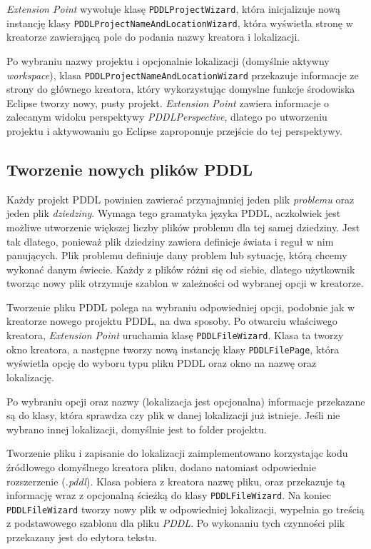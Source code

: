 \emph{Extension Point} wywołuje klasę \texttt{PDDLProjectWizard}, która inicjalizuje nową instancję klasy \texttt{PDDLProjectNameAndLocationWizard}, która wyświetla stronę w kreatorze zawierającą pole do podania nazwy kreatora i lokalizacji. 

Po wybraniu nazwy projektu i opcjonalnie lokalizacji (domyślnie aktywny \emph{workspace}), klasa \texttt{PDDLProjectNameAndLocationWizard} przekazuje informacje ze strony do głównego kreatora, który wykorzystując domyslne funkcje środowiska Eclipse tworzy nowy, pusty projekt. \emph{Extension Point} zawiera informacje o zalecanym widoku perspektywy \emph{PDDLPerspective}, dlatego po utworzeniu projektu i aktywowaniu go Eclipse zaproponuje przejście do tej perspektywy.


\subsection{Tworzenie nowych plików PDDL}
Każdy projekt PDDL powinien zawierać przynajmniej jeden plik \emph{problemu} oraz jeden plik \emph{dziedziny}. Wymaga tego gramatyka języka PDDL, aczkolwiek jest możliwe utworzenie większej liczby plików problemu dla tej samej dziedziny. Jest tak dlatego, ponieważ plik dziedziny zawiera definicje świata i reguł w nim panujących. Plik problemu definiuje dany problem lub sytuację, którą chcemy wykonać danym świecie. Każdy z plików różni się od siebie, dlatego użytkownik tworząc nowy plik otrzymuje szablon w zależności od wybranej opcji w kreatorze. 

Tworzenie pliku PDDL polega na wybraniu odpowiedniej opcji, podobnie jak w kreatorze nowego projektu PDDL, na dwa sposoby. Po otwarciu właściwego kreatora, \emph{Extension Point} uruchamia klasę \texttt{PDDLFileWizard}. Klasa ta tworzy okno kreatora, a następne tworzy nową instancję klasy \texttt{PDDLFilePage}, która wyświetla opcję do wyboru typu pliku PDDL oraz okno na nazwę oraz lokalizację.

Po wybraniu opcji oraz nazwy (lokalizacja jest opcjonalna) informacje przekazane są do klasy, która sprawdza czy plik w danej lokalizacji już istnieje. Jeśli nie wybrano innej lokalizacji, domyślnie jest to folder projektu.
 
Tworzenie pliku i zapisanie do lokalizacji zaimplementowano korzystając kodu źródłowego domyślnego kreatora pliku, dodano natomiast odpowiednie rozszerzenie (\emph{.pddl}). Klasa pobiera z kreatora nazwę pliku, oraz przekazuje tą informację wraz z opcjonalną ścieżką do klasy \texttt{PDDLFileWizard}. Na koniec \texttt{PDDLFileWizard} tworzy nowy plik w odpowiedniej lokalizacji, wypełnia go treścią z podstawowego szablonu dla pliku \emph{PDDL}. Po wykonaniu tych czynności plik przekazany jest do edytora tekstu.

